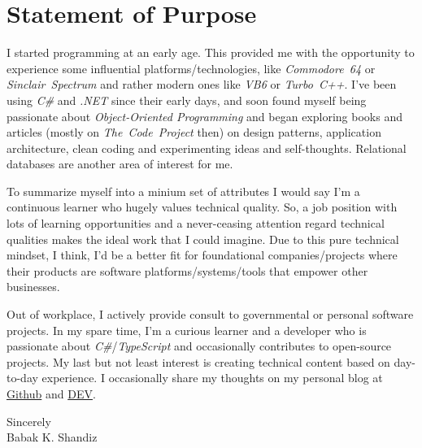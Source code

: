 \documentclass[10pt,a4paper]{article}
\begin{document}


\section*{Statement of Purpose}

I started programming at an early age. This provided me with the opportunity
to experience some influential platforms/technologies, like
\textit{Commodore~64} or \textit{Sinclair~Spectrum} and rather modern ones
like \textit{VB6} or \textit{Turbo~C++}. I've been using \textit{C\#} and
\textit{.NET} since their early days, and soon found myself being passionate
about \textit{Object-Oriented Programming} and began exploring books and
articles (mostly on \textit{The~Code~Project} then) on design patterns,
application architecture, clean coding and experimenting ideas and
self-thoughts. Relational databases are another area of interest for me.

To summarize myself into a minium set of attributes I would say I'm a
continuous learner who hugely values technical quality. So, a job position with
lots of learning opportunities and a never-ceasing attention regard technical
qualities makes the ideal work that I could imagine. Due to this pure technical
mindset, I think, I'd be a better fit for foundational companies/projects where
their products are software platforms/systems/tools that empower other
businesses.

Out of workplace, I actively provide consult to governmental or personal
software projects. In my spare time, I'm a curious learner and a developer who
is passionate about \textit{C\#}/\textit{TypeScript} and occasionally
contributes to open-source projects. My last but not least interest is
creating technical content based on day-to-day experience. I occasionally
share my thoughts on my personal blog at
\href{https://babakks.github.io}{Github} and
\href{https://dev.to/babakks}{DEV}.

\vspace{2em}
\noindent
Sincerely \\
\noindent
Babak K. Shandiz
\end{document}
